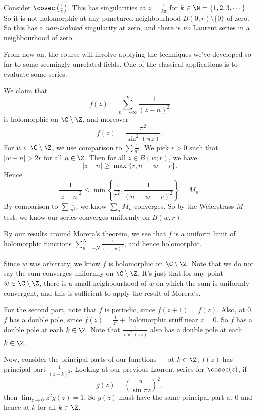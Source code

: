 \documentclass[a4paper]{article}
\begin{document}
\begin{eg}
  Consider $\cosec \left(\frac{1}{z}\right)$. This has singularities at $z = \frac{1}{k\pi}$ for $k \in \N = \{1, 2, 3, \cdots\}$. So it is not holomorphic at any punctured neighbourhood $B(0, r)\setminus \{0\}$ of zero. So this has a \emph{non-isolated} singularity at zero, and there is \emph{no} Laurent series in a neighbourhood of zero.
\end{eg}

From now on, the course will involve applying the techniques we've developed so far to some seemingly unrelated fields. One of the classical applications is to evaluate some series.
\begin{eg}
  We claim that
  \[
    f(z) = \sum_{n = -\infty}^\infty \frac{1}{(z - n)^2}
  \]
  is holomorphic on $\C \setminus \Z$, and moreover
  \[
    f(z) = \frac{\pi^2}{\sin^2(\pi z)}.
  \]
  For $w \in \C\setminus \Z$, we use comparison to $\sum \frac{1}{n^2}$. We pick $r > 0$ such that $|w - n| > 2r$ for all $n \in \Z$. Then for all $z \in B(w; r)$, we have
  \[
    |z - n| \geq \max\{r, n - |w| - r\}.
  \]
  Hence
  \[
    \frac{1}{|z - n|^2} \leq \min\left\{\frac{1}{r^2}, \frac{1}{(n - |w| - r)^2}\right\} = M_n.
  \]
  By comparison to $\sum \frac{1}{n^2}$, we know $\sum_n M_n$ converges. So by the Weierstrass $M$-test, we know our series converges uniformly on $B(w, r)$.

  By our results around Morera's theorem, we see that $f$ is a uniform limit of holomorphic functions $\sum_{n = -N}^N \frac{1}{(z - n)^2}$, and hence holomorphic.

  Since $w$ was arbitrary, we know $f$ is holomorphic on $\C \setminus \Z$. Note that we do not say the sum converges uniformly on $\C \setminus \Z$. It's just that for any point $w \in \C \setminus \Z$, there is a small neighbourhood of $w$ on which the sum is uniformly convergent, and this is sufficient to apply the result of Morera's.

  For the second part, note that $f$ is periodic, since $f(z + 1) = f(z)$. Also, at $0$, $f$ has a double pole, since $f(z) = \frac{1}{z^2} + $ holomorphic stuff near $z = 0$. So $f$ has a double pole at each $k \in \Z$. Note that $\frac{1}{\sin^2 (\pi z)}$ also has a double pole at each $k \in \Z$.

  Now, consider the principal parts of our functions --- at $k \in \Z$, $f(z)$ has principal part $\frac{1}{(z - k)^2}$. Looking at our previous Laurent series for $\cosec (z)$, if
  \[
    g(z) = \left(\frac{\pi}{\sin \pi z}\right)^2,
  \]
  then $\lim_{z \to 0} z^2 g(z) = 1$. So $g(z)$ must have the same principal part at $0$ and hence at $k$ for all $k \in \Z$.


\end{eg}
\end{document}
